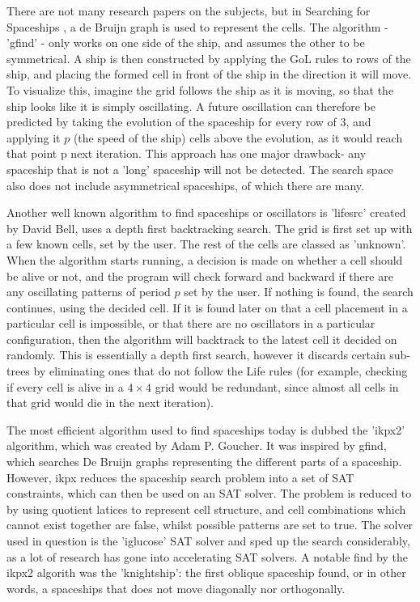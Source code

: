 \documentclass{l4proj}
\begin{document}
There are not many research papers on the subjects, but in Searching for Spaceships \citep{searching_for_spaceships}, a de Bruijn graph is used to represent the cells. The algorithm - 'gfind' - only works on one side of the ship, and assumes the other to be symmetrical. A ship is then constructed by applying the GoL rules to rows of the ship, and placing the formed cell in front of the ship in the direction it will move. To visualize this, imagine the grid follows the ship as it is moving, so that the ship looks like it is simply oscillating. A future oscillation can therefore be predicted by taking the evolution of the spaceship for every row of 3, and applying it $p$ (the speed of the ship) cells above the evolution, as it would reach that point p next iteration. This approach has one major drawback- any spaceship that is not a 'long' spaceship will not be detected. The search space also does not include asymmetrical spaceships, of which there are many.

Another well known algorithm to find spaceships or oscillators is 'lifesrc' created by David Bell, uses a depth first backtracking search. The grid is first set up with a few known cells, set by the user. The rest of the cells are classed as 'unknown'. When the algorithm starts running, a decision is made on whether a cell should be alive or not, and the program will check forward and backward if there are any oscillating patterns of period $p$ set by the user. If nothing is found, the search continues, using the decided cell. If it is found later on that a cell placement in a particular cell is impossible, or that there are no oscillators in a particular configuration, then the algorithm will backtrack to the latest cell it decided on randomly. This is essentially a depth first search, however it discards certain sub-trees by eliminating ones that do not follow the Life rules (for example, checking if every cell is alive in a $4 \times 4$ grid would be redundant, since almost all cells in that grid would die in the next iteration). 

The most efficient algorithm used to find spaceships today is dubbed the 'ikpx2' algorithm, which was created by Adam P. Goucher. It was inspired by gfind, which searches De Bruijn graphs representing the different parts of a spaceship. However, ikpx reduces the spaceship search problem into a set of SAT constraints, which can then be used on an SAT solver. The problem is reduced to by using quotient latices to represent cell structure, and cell combinations which cannot exist together are false, whilst possible patterns are set to true. The solver used in question is the 'iglucose' \citep{sat_2018} SAT solver and sped up the search considerably, as a lot of research has gone into accelerating SAT solvers. A notable find by the ikpx2 algorith was the 'knightship': the first oblique spaceship found, or in other words, a spaceships that does not move diagonally nor orthogonally.
\end{document}

